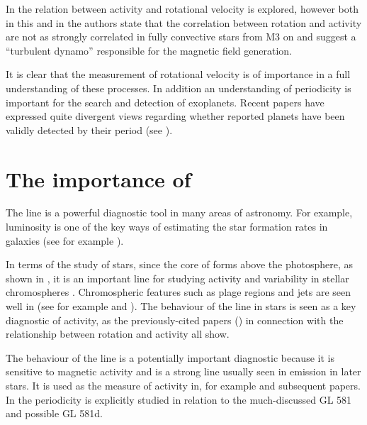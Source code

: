 In \citet{mohanty02} the relation between activity and rotational velocity is explored, however both in this and in
\citet{mohanty03} the authors state that the correlation between rotation and activity are not as strongly correlated in
fully convective stars from M3 on and suggest a ``turbulent dynamo'' responsible for the magnetic field generation.

It is clear that the measurement of rotational velocity is of importance in a full understanding of these processes. In
addition an understanding of periodicity is important for the search and detection of exoplanets. Recent papers have
expressed quite divergent views regarding whether reported planets have been validly detected by their period (see
\citealt{barnes13,robertson14,robertson14a,tuomi13aug,robertson15}). 

\section{The importance of {\ha}}
\protect\label{section:intohalpha}

The {\ha} line is a powerful diagnostic tool in many areas of astronomy. For example, {\ha} luminosity is one of the key
ways of estimating the star formation rates in galaxies (see for example \citet{rosagonzalez02}).

In terms of the study of stars, since the core of {\ha} forms above the photosphere, as shown in \citep{vernazza81}, it
is an important line for studying activity and variability in stellar chromospheres \citep{hall08}. Chromospheric
features such as plage regions and jets are seen well in {\ha} (see for example \citet{kneer10} and \citet{kuridze11}). 
The behaviour of the {\ha} line in {\rdwarf} stars is seen as a key diagnostic of activity, as the previously-cited
papers (\citealt{mohanty02, mohanty03, reiners08, schmidt14}) in connection with the relationship between rotation and
activity all show.

The behaviour of the {\ha} line is a potentially important diagnostic because it is sensitive to magnetic activity and
is a strong line usually seen in emission in later {\rdwarf} stars. It is used as the measure of activity in, for
example \citet{mohanty03} and subsequent papers. In \citet{hatzes15} the {\ha} periodicity is explicitly studied in
relation to the much-discussed GL 581 and possible GL 581d.

\section{\prox}
\protect\label{section:intoprox}

